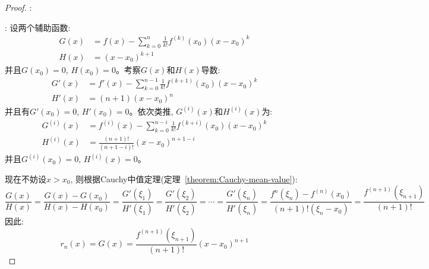 \begin{proof}
    :

    :
    设两个辅助函数:
    \begin{equation*}
        \begin{split}
            G(x) &= f(x) - \sum_{k=0}^n\frac{1}{k!}f^{(k)}(x_0)(x - x_0)^k \\
            H(x) &= (x - x_0)^{k+1}
        \end{split}
    \end{equation*}
    并且$G(x_0) = 0$, $H(x_0) = 0$。考察$G(x)$和$H(x)$导数:
    \begin{equation*}
        \begin{split}
            G'(x) &= f'(x) - \sum_{k=0}^{n-1}\frac{1}{k!}f^{(k+1)}(x_0)(x-x_0)^k \\ 
            H'(x) &= (n+1)(x - x_0)^{n}
        \end{split}
    \end{equation*}
    并且有$G'(x_0) = 0$, $H'(x_0) = 0$。依次类推, $G^{(i)}(x)$和$H^{(i)}(x)$为:
    \begin{equation*}
        \begin{split}
            G^{(i)}(x) &= f^{(i)}(x) - \sum_{k=0}^{n-i}\frac{1}{k!}f^{(k+i)}(x_0)(x-x_0)^k \\ 
            H^{(i)}(x) &= \frac{(n+1)!}{(n+1-i)!}(x - x_0)^{n+1-i}            
        \end{split}
    \end{equation*}
    并且$G^{(i)}(x_0) = 0$, $H^{(i)}(x) = 0$。
    
    
    现在不妨设$x > x_0$, 则根据Cauchy中值定理(定理~\ref{theorem:Cauchy-mean-value}):
    \begin{equation*}
        \frac{G(x)}{H(x)} = \frac{G(x) - G(x_0)}{H(x) - H(x_0)} = \frac{G'(\xi_1)}{H'(\xi_1)} = \frac{G'(\xi_2)}{H'(\xi_2)} = \cdots = \frac{G'(\xi_n)}{H'(\xi_n)} = \frac{f^{n}(\xi_n) - f^{(n)}(x_0)}{(n+1)!(\xi_n - x_0)} = \frac{f^{(n+1)}(\xi_{n+1})}{(n+1)!}
    \end{equation*}
    因此:
    \begin{equation*}
        r_n(x) = G(x) = \frac{f^{(n+1)}(\xi_{n+1})}{(n+1)!}(x - x_0)^{n+1}
    \end{equation*}
    
\end{proof}

